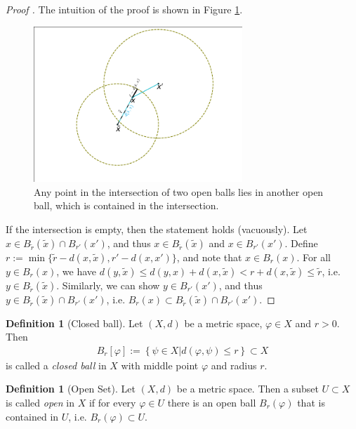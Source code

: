 \documentclass[12pt, a4paper]{article}
\numberwithin{equation}{section}
\theoremstyle{definition}
\theoremstyle{definition}
\newtheorem{defn}[thm]{Definition} %
\begin{document}
	\begin{proof}[Proof \cite{886810}]
		The intuition of the proof is shown in Figure \ref{fig:open_balls_intersection}.
		\begin{figure}[h!]
			\centering
			\includegraphics[trim={2.5cm 0.9cm 1.7cm 0.14cm}, clip, width=0.7\textwidth]{Figures/circles_modified.pdf}
			\caption{Any point in the intersection of two open balls lies in another open ball, which is contained in the intersection.}
			\label{fig:open_balls_intersection}
		\end{figure}
		If the intersection is empty, then the statement holds (vacuously). Let $x\in B_{\tilde{r}}(\tilde{x}) \cap B_{r'}(x')$, and thus $x\in B_{\tilde{r}}(\tilde{x})$ and $x\in B_{r'}(x')$. Define $r := \min\{ \tilde{r} - d(x, \tilde{x}), r' - d(x, x') \}$, and note that $x\in B_{r}(x)$. For all $y\in B_{r}(x)$, we have $d(y, \tilde{x}) \leq d(y, x) + d(x, \tilde{x}) < r + d(x, \tilde{x}) \leq \tilde{r}$, i.e. $y\in B_{\tilde{r}}(\tilde{x})$. Similarly, we can show $y\in B_{r'}(x')$, and thus $y\in B_{\tilde{r}}(\tilde{x})\cap B_{r'}(x')$, i.e. $B_{r}(x)\subset B_{\tilde{r}}(\tilde{x})\cap B_{r'}(x')$.
	\end{proof}
		
	 \begin{defn}[Closed ball]
		Let $(X, d)$ be a metric space, $\varphi\in X$ and $r > 0$. Then 
		\begin{align}
			B_{r}[\varphi] := \left\{ \psi\in X \vert d(\varphi, \psi) \leq r\right\} \subset X
		\end{align}
		is called a \textit{closed ball} in $X$ with middle point $\varphi$ and radius $r$.
	\end{defn}
	
	\begin{defn}[Open Set]
		\label{defn-open-set}
		Let $(X, d)$ be a metric space. Then a subset $U\subset X$ is called \textit{open} in $X$ if for every $\varphi \in U$ there is an open ball $B_{r}(\varphi)$ that is contained in $U$, i.e. $B_r(\varphi)\subset U$. 
	\end{defn}
\end{document}
